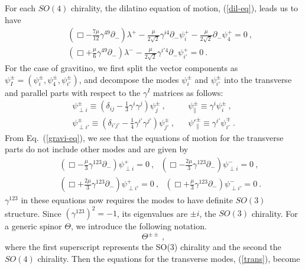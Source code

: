 \documentclass[a4paper,12pt]{article}
\numberwithin{equation}{section}
\begin{document}
For each $SO(4)$ chirality, the dilatino equation of motion,
(\ref{dil-eq}), leads us to have
\begin{eqnarray}
 & & ( \Box - \frac{7 \mu}{12} \gamma^{49} \partial_- ) \lambda^+
    - \frac{\mu}{2\sqrt{2}} \gamma^{i4} \partial_- \psi^+_i
    - \frac{\mu}{2 \sqrt{2}} \partial_- \psi^+_4 = 0 ~,
\label{sd+}
     \\
 & & ( \Box + \frac{\mu}{6} \gamma^{49} \partial_- ) \lambda^-
    - \frac{\mu}{2 \sqrt{2}} \gamma^{i'4} \partial_- \psi^+_{i'} = 0
 ~.
\label{sd-}
\end{eqnarray}
For the case of gravitino, we first split the vector components as
$\psi_I^\pm = ( \psi_i^\pm, \psi_4^\pm, \psi_{i'}^\pm)$, and decompose
the modes $\psi_i^\pm$ and $\psi_{i'}^\pm$ into the transverse and
parallel parts with respect to the $\gamma^I$ matrices as follows:
\begin{eqnarray}
\psi^\pm_{\perp i} \equiv
( \delta_{ij} - \frac{1}{3} \gamma^i \gamma^j )
 \psi^\pm_j ~, & &
\psi^\pm_\| \equiv \gamma^i \psi^\pm_i ~,
   \nonumber \\
\psi^\pm_{\perp i'} \equiv ( \delta_{i'j'}
  - \frac{1}{4} \gamma^{i'} \gamma^{j'} )
 \psi^\pm_{j'} ~, & &
\psi'^\pm_\| \equiv \gamma^{i'} \psi^\mp_{i'} ~.
\end{eqnarray}
From Eq.~(\ref{gravi-eq}), we see that the equations of motion for the
transverse parts do not include other modes and are given by
\begin{eqnarray}
& & ( \Box - \frac{\mu}{3} \gamma^{123} \partial_- )
      \psi^+_{\perp i} = 0~,~~~
    ( \Box - \frac{2 \mu}{3}  \gamma^{123} \partial_-)
      \psi^-_{\perp i} = 0 ~,
 \nonumber \\
& & ( \Box + \frac{2 \mu}{3} \gamma^{123} \partial_- )
      \psi^+_{\perp i'} = 0~,~~~
    ( \Box + \frac{\mu}{3}  \gamma^{123} \partial_-)
      \psi^-_{\perp i'} = 0 ~.
\label{trans}
\end{eqnarray}
$\gamma^{123}$ in these equations now requires the modes to have
definite $SO(3)$ structure.  Since $(\gamma^{123})^2 = -1$, its
eigenvalues are $\pm i$, the $SO(3)$ chirality.  For a generic spinor
$\Theta$, we introduce the following notation.
\begin{equation}
\Theta^{\pm \pm} ~,
\label{34d}
\end{equation}
where the first superscript represents the SO(3) chirality and the
second the $SO(4)$ chirality.  Then the equations for the transverse
modes, (\ref{trans}), become
\end{document}
